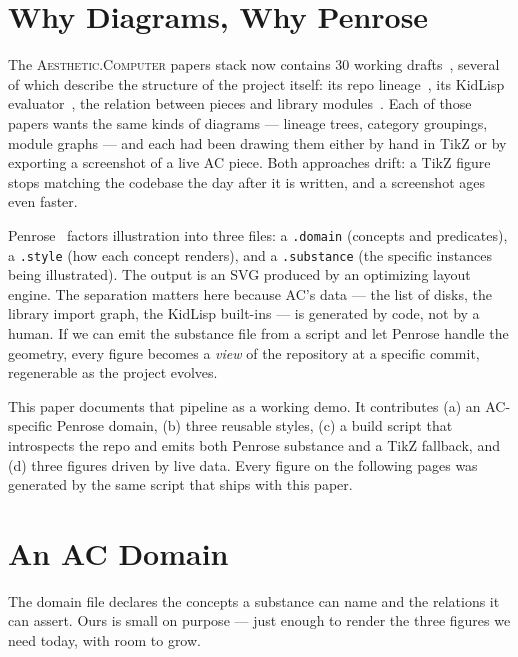 \documentclass[10pt,letterpaper,twocolumn]{article}
\newcommand{\ac}{\textsc{Aesthetic.Computer}}
\begin{document}

\section{Why Diagrams, Why Penrose}

The \ac{} papers stack now contains 30 working drafts~\citep{scudder2026score}, several of which describe the structure of the project itself: its repo lineage~\citep{scudder2026archaeology}, its KidLisp evaluator~\citep{scudder2026kidlisp}, the relation between pieces and library modules~\citep{scudder2026pieces}. Each of those papers wants the same kinds of diagrams --- lineage trees, category groupings, module graphs --- and each had been drawing them either by hand in TikZ or by exporting a screenshot of a live AC piece. Both approaches drift: a TikZ figure stops matching the codebase the day after it is written, and a screenshot ages even faster.

Penrose~\citep{ye2020penrose} factors illustration into three files: a \texttt{.domain} (concepts and predicates), a \texttt{.style} (how each concept renders), and a \texttt{.substance} (the specific instances being illustrated). The output is an SVG produced by an optimizing layout engine. The separation matters here because AC's data --- the list of disks, the library import graph, the KidLisp built-ins --- is generated by code, not by a human. If we can emit the substance file from a script and let Penrose handle the geometry, every figure becomes a \emph{view} of the repository at a specific commit, regenerable as the project evolves.

This paper documents that pipeline as a working demo. It contributes (a) an AC-specific Penrose domain, (b) three reusable styles, (c) a build script that introspects the repo and emits both Penrose substance and a TikZ fallback, and (d) three figures driven by live data. Every figure on the following pages was generated by the same script that ships with this paper.


\section{An AC Domain}

The domain file declares the concepts a substance can name and the relations it can assert. Ours is small on purpose --- just enough to render the three figures we need today, with room to grow.
\end{document}
